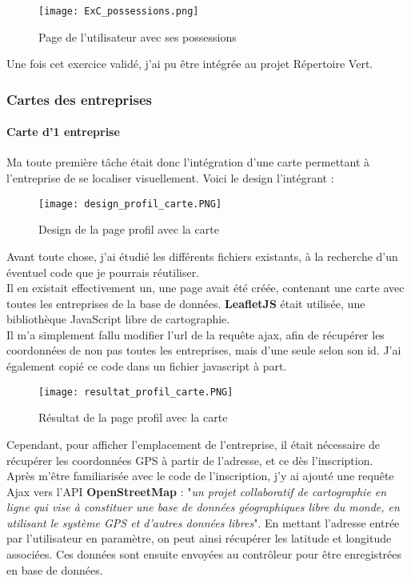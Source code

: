 \begin{figure}[H]
    \centering
    \texttt{[image: ExC\_possessions.png]}
    \caption{Page de l'utilisateur avec ses possessions}
\end{figure}

Une fois cet exercice validé, j'ai pu être intégrée au projet Répertoire Vert.


\subsubsection{Cartes des entreprises}

\paragraph{Carte d'1 entreprise}
Ma toute première tâche était donc l'intégration d'une carte permettant à l'entreprise de se localiser visuellement. Voici le design l'intégrant :

\begin{figure}[H]
    \centering
    \texttt{[image: design\_profil\_carte.PNG]}
    \caption{Design de la page profil avec la carte}
\end{figure}

Avant toute chose, j'ai étudié les différents fichiers existants, à la recherche d'un éventuel code que je pourrais réutiliser.
\\Il en existait effectivement un, une page avait été créée, contenant une carte avec toutes les entreprises de la base de données. \textbf{LeafletJS} était utilisée, une bibliothèque JavaScript libre de cartographie.
\\Il m'a simplement fallu modifier l'url de la requête ajax, afin de récupérer les coordonnées de non pas toutes les entreprises, mais d'une seule selon son id. J'ai également copié ce code dans un fichier javascript à part.

\begin{figure}[H]
    \centering
    \texttt{[image: resultat\_profil\_carte.PNG]}
    \caption{Résultat de la page profil avec la carte}
\end{figure}

Cependant, pour afficher l'emplacement de l'entreprise, il était nécessaire de récupérer les coordonnées GPS à partir de l'adresse, et ce dès l'inscription.\\
Après m'être familiarisée avec le code de l'inscription, j'y ai ajouté une requête Ajax vers l'API \textbf{OpenStreetMap} : "\emph{un projet collaboratif de cartographie en ligne qui vise à constituer une base de données géographiques libre du monde, en utilisant le système GPS et d'autres données libres}".
En mettant l'adresse entrée par l'utilisateur en paramètre, on peut ainsi récupérer les latitude et longitude associées. Ces données sont ensuite envoyées au contrôleur pour être enregistrées en base de données.


